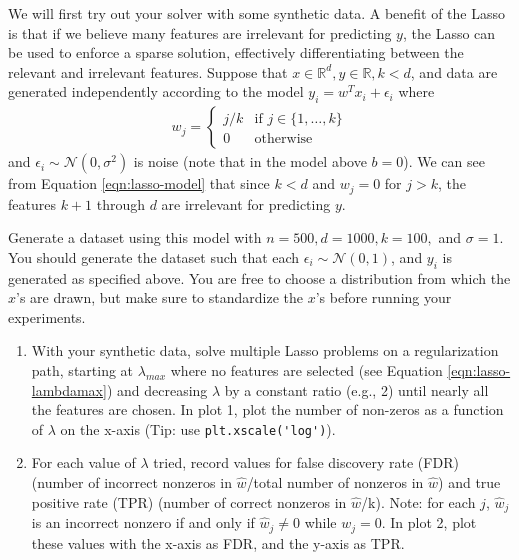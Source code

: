 \documentclass{article}
\begin{document}
\begin{aprob}
    We will first try out your solver with some synthetic data.
    A benefit of the Lasso is that if we believe many features are irrelevant for predicting ${y}$, the Lasso can be used to enforce a sparse solution, effectively differentiating between the relevant and irrelevant features.
    Suppose that ${x} \in \mathbb{R}^d, y \in \mathbb{R}, k < d$, and data are generated independently according to the model $y_i = w^T x_i + \epsilon_i$ where
    \begin{align}
        w_j = \begin{cases} j/k & \text{if } j \in \{1,\dots,k\} \\
        0 & \text{otherwise}
        \end{cases}\label{eqn:lasso-model}
    \end{align}
    and $\epsilon_i \sim \mathcal{N}(0, \sigma^2)$ is noise (note that in the model above $b=0$). We can see from Equation \eqref{eqn:lasso-model} that since $k < d$ and $w_j = 0$ for $j > k$, the features $k + 1$ through $d$ are irrelevant for predicting $y$.

    Generate a dataset using this model with $n = 500, d = 1000, k = 100,$ and $\sigma = 1$. You should generate the dataset such that each $\epsilon_i \sim \mathcal{N}(0, 1)$, and $y_i$ is generated as specified above. You are free to choose a distribution from which the $x$'s are drawn, but make sure to standardize the $x$'s before running your experiments.

    \begin{enumerate}
        \item {} With your synthetic data, solve multiple Lasso problems on a regularization path, starting at $\lambda_{max}$ where no features are selected (see Equation \eqref{eqn:lasso-lambdamax}) and decreasing $\lambda$ by a constant ratio (e.g., 2) until nearly all the features are chosen.
        In plot 1, plot the number of non-zeros as a function of $\lambda$ on the x-axis (Tip: use \verb|plt.xscale('log')|).
        \item {} For each value of $\lambda$ tried, record values for false discovery rate (FDR) (number of incorrect nonzeros in $\widehat{w}$/total number of nonzeros in $\widehat{w}$) and true positive rate (TPR)
        (number of correct nonzeros in $\widehat{w}$/k). Note: for each $j$, $\widehat{w}_j$ is an incorrect nonzero if and only if $\widehat{w}_j \neq 0$ while $w_j = 0$.
        In plot 2, plot these values with the x-axis as FDR, and the y-axis as TPR.


\end{enumerate}
\end{aprob}
\end{document}
